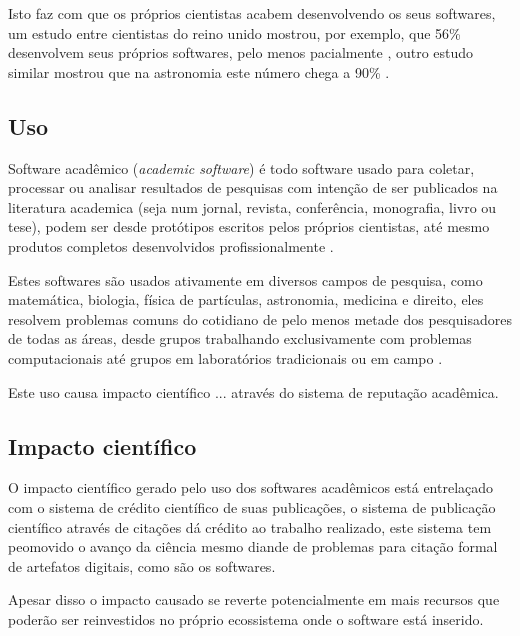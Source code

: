 Isto faz com que os próprios cientistas acabem desenvolvendo os seus softwares,
um estudo entre cientistas do reino unido mostrou, por exemplo, que 56\%
desenvolvem seus próprios softwares, pelo menos pacialmente
\cite{hettrick_2014_14809}, outro estudo similar mostrou que na astronomia este
número chega a 90\% \cite{momcheva2015software}.

\subsection{Uso}


Software acadêmico ({\it academic software}) é todo software usado para
coletar, processar ou analisar resultados de pesquisas com intenção de ser
publicados na literatura academica (seja num jornal, revista, conferência,
monografia, livro ou tese), podem ser desde protótipos escritos pelos próprios
cientistas, até mesmo produtos completos desenvolvidos profissionalmente
\cite{allen2017engineering}.

Estes softwares são usados ativamente em diversos campos de pesquisa, como
matemática, biologia, física de partículas, astronomia, medicina e direito,
eles resolvem problemas comuns do cotidiano de pelo menos metade dos
pesquisadores de todas as áreas, desde grupos trabalhando exclusivamente com
problemas computacionais até grupos em laboratórios tradicionais ou em campo
\cite{wilson2014best}.

Este uso causa impacto científico ... através do sistema de reputação acadêmica.

\subsection{Impacto científico}


O impacto científico gerado pelo uso dos softwares acadêmicos está
entrelaçado com o sistema de crédito científico de suas publicações,
o sistema de publicação científico através de citações dá crédito ao
trabalho realizado, este sistema tem peomovido o avanço da ciência
mesmo diande de problemas para citação formal de artefatos digitais,
como são os softwares.

Apesar disso o impacto causado se reverte potencialmente em mais
recursos que poderão ser reinvestidos no próprio ecossistema onde
o software está inserido.

